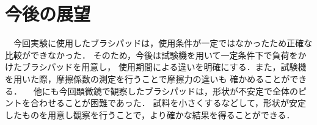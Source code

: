 \documentclass[main]{subfiles}
\begin{document}
\chapter{今後の展望}
　今回実験に使用したブラシパッドは，使用条件が一定ではなかったため正確な比較ができなかった．
そのため，今後は試験機を用いて一定条件下で負荷をかけたブラシパッドを用意し，
使用期間による違いを明確にする．また，試験機を用いた際，摩擦係数の測定を行うことで摩擦力の違いも
確かめることができる．
　他にも今回顕微鏡で観察したブラシパッドは，形状が不安定で全体のピントを合わせることが困難であった．
試料を小さくするなどして，形状が安定したものを用意し観察を行うことで，より確かな結果を得ることができる．
\end{document}
